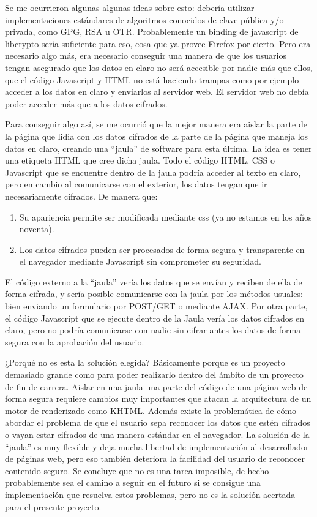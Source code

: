 Se me ocurrieron algunas algunas ideas sobre esto: debería utilizar implementaciones estándares de algoritmos conocidos de clave pública y/o privada, como GPG, RSA u OTR. Probablemente un binding de javascript de libcrypto sería suficiente para eso, cosa que ya provee Firefox por cierto. Pero era necesario algo más, era necesario conseguir una manera de que los usuarios tengan asegurado que los datos en claro no será accesible por nadie más que ellos, que el código Javascript y HTML no está haciendo trampas como por ejemplo acceder a los datos en claro y enviarlos al servidor web. El servidor web no debía poder acceder más que a los datos cifrados.

Para conseguir algo así, se me ocurrió que la mejor manera era aislar la parte de la página que lidia con los datos cifrados de la parte de la página que maneja los datos en claro, creando una ``jaula'' de software para esta última. La idea es tener una etiqueta HTML que cree dicha jaula. Todo el código HTML, CSS o Javascript que se encuentre dentro de la jaula podría acceder al texto en claro, pero en cambio al comunicarse con el exterior, los datos tengan que ir necesariamente cifrados. De manera que:

\begin{enumerate}
 \item Su apariencia permite ser modificada mediante css (ya no estamos en los años noventa).
 \item Los datos cifrados pueden ser procesados de forma segura y transparente en el navegador mediante Javascript sin comprometer su seguridad.
\end{enumerate}

El código externo a la ``jaula'' vería los datos que se envían y reciben de ella de forma cifrada, y sería posible comunicarse con la jaula por los métodos usuales: bien enviando un formulario por POST/GET o mediante AJAX. Por otra parte, el código Javascript que se ejecute dentro de la Jaula vería los datos cifrados en claro, pero no podría comunicarse con nadie sin cifrar antes los datos de forma segura con la aprobación del usuario.

¿Porqué no es esta la solución elegida? Básicamente porque es un proyecto demasiado grande como para poder realizarlo dentro del ámbito de un proyecto de fin de carrera. Aislar en una jaula una parte del código de una página web de forma segura requiere cambios muy importantes que atacan la arquitectura de un motor de renderizado como KHTML. Además existe la problemática de cómo abordar el problema de que el usuario sepa reconocer los datos que estén cifrados o vayan estar cifrados de una manera estándar en el navegador. La solución de la ``jaula'' es muy flexible y deja mucha libertad de implementación al desarrollador de páginas web, pero eso también deteriora la facilidad del usuario de reconocer contenido seguro. Se concluye que no es una tarea imposible, de hecho probablemente sea el camino a seguir en el futuro si se consigue una implementación que resuelva estos problemas, pero no es la solución acertada para el presente proyecto.


